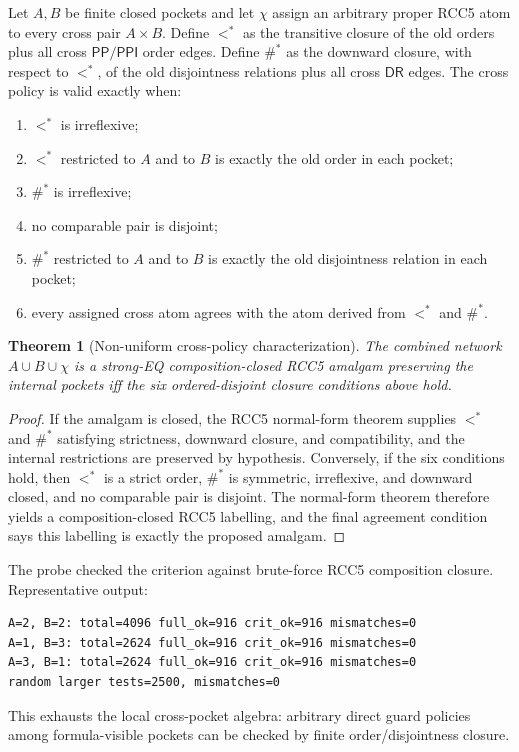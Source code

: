 \documentclass[11pt]{article}
\newtheorem{theorem}{Theorem}[section]
\newcommand{\PP}{\mathsf{PP}}
\newcommand{\PPI}{\mathsf{PPI}}
\newcommand{\DR}{\mathsf{DR}}
\begin{document}
Let $A,B$ be finite closed pockets and let $\chi$ assign an arbitrary proper RCC5 atom to every cross pair $A\times B$.  Define $<^*$ as the transitive closure of the old orders plus all cross $\PP/\PPI$ order edges.  Define $\#^*$ as the downward closure, with respect to $<^*$, of the old disjointness relations plus all cross $\DR$ edges.  The cross policy is valid exactly when:
\begin{enumerate}
\item $<^*$ is irreflexive;
\item $<^*$ restricted to $A$ and to $B$ is exactly the old order in each pocket;
\item $\#^*$ is irreflexive;
\item no comparable pair is disjoint;
\item $\#^*$ restricted to $A$ and to $B$ is exactly the old disjointness relation in each pocket;
\item every assigned cross atom agrees with the atom derived from $<^*$ and $\#^*$.
\end{enumerate}

\begin{theorem}[Non-uniform cross-policy characterization]
The combined network $A\cup B\cup\chi$ is a strong-EQ composition-closed RCC5 amalgam preserving the internal pockets iff the six ordered-disjoint closure conditions above hold.
\end{theorem}

\begin{proof}
If the amalgam is closed, the RCC5 normal-form theorem supplies $<^*$ and $\#^*$ satisfying strictness, downward closure, and compatibility, and the internal restrictions are preserved by hypothesis.  Conversely, if the six conditions hold, then $<^*$ is a strict order, $\#^*$ is symmetric, irreflexive, and downward closed, and no comparable pair is disjoint.  The normal-form theorem therefore yields a composition-closed RCC5 labelling, and the final agreement condition says this labelling is exactly the proposed amalgam.
\end{proof}

The probe checked the criterion against brute-force RCC5 composition closure.  Representative output:
\begin{verbatim}
A=2, B=2: total=4096 full_ok=916 crit_ok=916 mismatches=0
A=1, B=3: total=2624 full_ok=916 crit_ok=916 mismatches=0
A=3, B=1: total=2624 full_ok=916 crit_ok=916 mismatches=0
random larger tests=2500, mismatches=0
\end{verbatim}
This exhausts the local cross-pocket algebra: arbitrary direct guard policies among formula-visible pockets can be checked by finite order/disjointness closure.
\end{document}
